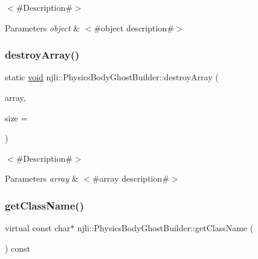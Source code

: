 $<$\#\+Description\#$>$


\begin{DoxyParams}{Parameters}
{\em object} & $<$\#object description\#$>$ \\
\hline
\end{DoxyParams}
\mbox{\label{classnjli_1_1_physics_body_ghost_builder_aba77f6706afe0860812540eb958c81c4}} 
\subsubsection{\texorpdfstring{destroy\+Array()}{destroyArray()}}
{\footnotesize\ttfamily static \mbox{\hyperlink{_thread_8h_af1e856da2e658414cb2456cb6f7ebc66}{void}} njli\+::\+Physics\+Body\+Ghost\+Builder\+::destroy\+Array (\begin{DoxyParamCaption}\item[{\mbox{\hyperlink{classnjli_1_1_physics_body_ghost_builder}{Physics\+Body\+Ghost\+Builder}} $\ast$$\ast$}]{array,  }\item[{const \mbox{\hyperlink{_util_8h_a10e94b422ef0c20dcdec20d31a1f5049}{u32}}}]{size = {} }\end{DoxyParamCaption})\hspace{0.3cm}{\ttfamily [static]}}

$<$\#\+Description\#$>$


\begin{DoxyParams}{Parameters}
{\em array} & $<$\#array description\#$>$ \\
\hline
\end{DoxyParams}
\mbox{\label{classnjli_1_1_physics_body_ghost_builder_aa8e8fdecaf2d8c03f6f347f5b0952844}} 
\subsubsection{\texorpdfstring{get\+Class\+Name()}{getClassName()}}
{\footnotesize\ttfamily virtual const char$\ast$ njli\+::\+Physics\+Body\+Ghost\+Builder\+::get\+Class\+Name (\begin{DoxyParamCaption}{ }\end{DoxyParamCaption}) const\hspace{0.3cm}{\ttfamily [virtual]}}

